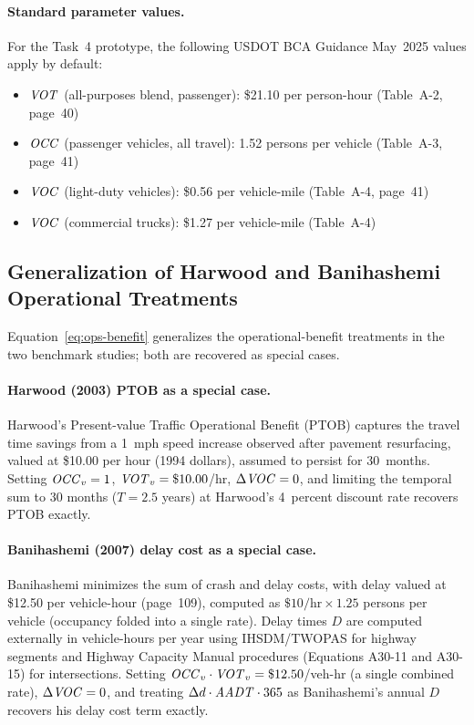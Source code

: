 \paragraph{Standard parameter values.} For the Task~4 prototype, the
following USDOT BCA Guidance May~2025 values apply by default:
\begin{itemize}[leftmargin=2em, itemsep=2pt]
  \item $\mathit{VOT}$ (all-purposes blend, passenger): \$21.10 per person-hour
    (Table~A-2, page~40)
  \item $\mathit{OCC}$ (passenger vehicles, all travel): 1.52 persons per vehicle
    (Table~A-3, page~41)
  \item $\mathit{VOC}$ (light-duty vehicles): \$0.56 per vehicle-mile (Table~A-4,
    page~41)
  \item $\mathit{VOC}$ (commercial trucks): \$1.27 per vehicle-mile (Table~A-4)
\end{itemize}

\subsection{Generalization of Harwood and Banihashemi Operational Treatments}

Equation~\ref{eq:ops-benefit} generalizes the operational-benefit treatments
in the two benchmark studies; both are recovered as special cases.

\paragraph{Harwood (2003) PTOB as a special case.} Harwood's
Present-value Traffic Operational Benefit (PTOB) captures the travel time
savings from a 1~mph speed increase observed after pavement resurfacing,
valued at \$10.00 per hour (1994 dollars), assumed to persist for 30~months.
Setting $\mathit{OCC}_v = 1$, $\mathit{VOT}_v = \$10.00$/hr, $\Delta\mathit{VOC} = 0$, and limiting
the temporal sum to 30 months ($T = 2.5$ years) at Harwood's 4~percent
discount rate recovers PTOB exactly.

\paragraph{Banihashemi (2007) delay cost as a special case.}
Banihashemi minimizes the sum of crash and delay costs, with delay valued at
\$12.50 per vehicle-hour (page~109), computed as
$\$10/\text{hr} \times 1.25$ persons per vehicle (occupancy folded into a
single rate). Delay times $D$ are computed externally in vehicle-hours per
year using IHSDM/TWOPAS for highway segments and Highway Capacity Manual
procedures (Equations A30-11 and A30-15) for intersections. Setting
$\mathit{OCC}_v \cdot \mathit{VOT}_v = \$12.50$/veh-hr (a single combined rate),
$\Delta\mathit{VOC} = 0$, and treating $\Delta d \cdot \mathit{AADT} \cdot 365$ as
Banihashemi's annual $D$ recovers his delay cost term exactly.

